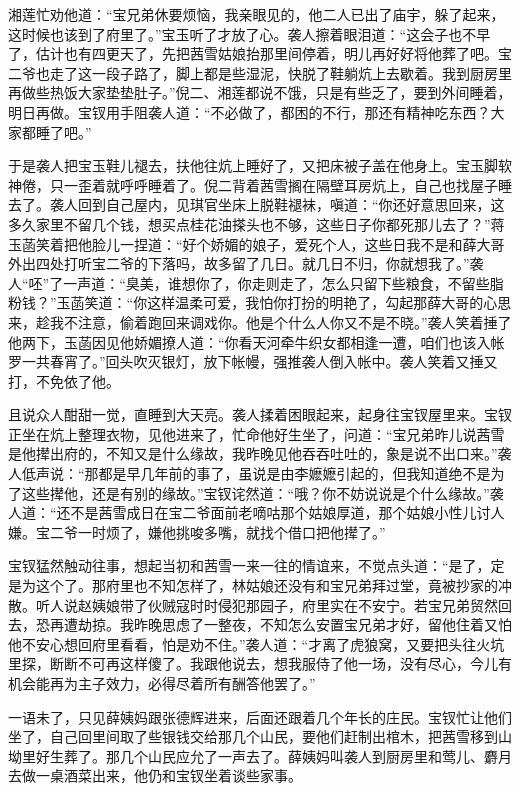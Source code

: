 \documentclass[12pt,oneside]{book}
\begin{document}
湘莲忙劝他道：“宝兄弟休要烦恼，我亲眼见的，他二人已出了庙宇，躲了起来，这时候也该到了府里了。”宝玉听了才放了心。袭人擦着眼泪道：“这会子也不早了，估计也有四更天了，先把茜雪姑娘抬那里间停着，明儿再好好将他葬了吧。宝二爷也走了这一段子路了，脚上都是些湿泥，快脱了鞋躺炕上去歇着。我到厨房里再做些热饭大家垫垫肚子。”倪二、湘莲都说不饿，只是有些乏了，要到外间睡着，明日再做。宝钗用手阻袭人道：“不必做了，都困的不行，那还有精神吃东西？大家都睡了吧。”

于是袭人把宝玉鞋儿褪去，扶他往炕上睡好了，又把床被子盖在他身上。宝玉脚软神倦，只一歪着就呼呼睡着了。倪二背着茜雪搁在隔壁耳房炕上，自己也找屋子睡去了。袭人回到自己屋内，见琪官坐床上脱鞋褪袜，嗔道：“你还好意思回来，这多久家里不留几个钱，想买点桂花油搽头也不够，这些日子你都死那儿去了？”蒋玉菡笑着把他脸儿一捏道：“好个娇媚的娘子，爱死个人，这些日我不是和薛大哥外出四处打听宝二爷的下落吗，故多留了几日。就几日不归，你就想我了。”袭人“呸”了一声道：“臭美，谁想你了，你走则走了，怎么只留下些粮食，不留些脂粉钱？”玉菡笑道：“你这样温柔可爱，我怕你打扮的明艳了，勾起那薛大哥的心思来，趁我不注意，偷着跑回来调戏你。他是个什么人你又不是不晓。”袭人笑着捶了他两下，玉菡因见他娇媚撩人道：“你看天河牵牛织女都相逢一遭，咱们也该入帐罗一共春宵了。”回头吹灭银灯，放下帐幔，强推袭人倒入帐中。袭人笑着又捶又打，不免依了他。

且说众人酣甜一觉，直睡到大天亮。袭人揉着困眼起来，起身往宝钗屋里来。宝钗正坐在炕上整理衣物，见他进来了，忙命他好生坐了，问道：“宝兄弟昨儿说茜雪是他撵出府的，不知又是什么缘故，我昨晚见他吞吞吐吐的，象是说不出口来。”袭人低声说：“那都是早几年前的事了，虽说是由李嬷嬷引起的，但我知道绝不是为了这些撵他，还是有别的缘故。”宝钗诧然道：“哦？你不妨说说是个什么缘故。”袭人道：“还不是茜雪成日在宝二爷面前老嘀咕那个姑娘厚道，那个姑娘小性儿讨人嫌。宝二爷一时烦了，嫌他挑唆多嘴，就找个借口把他撵了。”

宝钗猛然触动往事，想起当初和茜雪一来一往的情谊来，不觉点头道：“是了，定是为这个了。那府里也不知怎样了，林姑娘还没有和宝兄弟拜过堂，竟被抄家的冲散。听人说赵姨娘带了伙贼寇时时侵犯那园子，府里实在不安宁。若宝兄弟贸然回去，恐再遭劫掠。我昨晚思虑了一整夜，不知怎么安置宝兄弟才好，留他住着又怕他不安心想回府里看看，怕是劝不住。”袭人道：“才离了虎狼窝，又要把头往火坑里探，断断不可再这样傻了。我跟他说去，想我服侍了他一场，没有尽心，今儿有机会能再为主子效力，必得尽着所有酬答他罢了。”

一语未了，只见薛姨妈跟张德辉进来，后面还跟着几个年长的庄民。宝钗忙让他们坐了，自己回里间取了些银钱交给那几个山民，要他们赶制出棺木，把茜雪移到山坳里好生葬了。那几个山民应允了一声去了。薛姨妈叫袭人到厨房里和莺儿、麝月去做一桌酒菜出来，他仍和宝钗坐着谈些家事。
\end{document}

